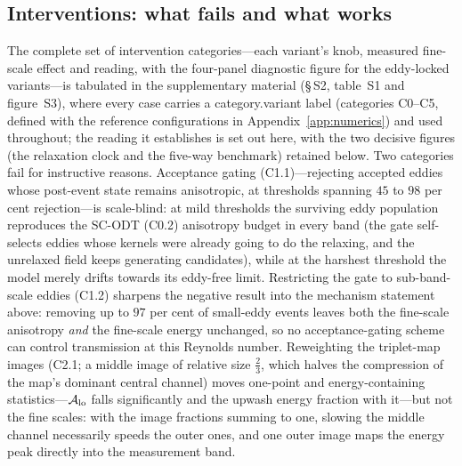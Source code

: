 \documentclass[lineno]{JFM-FLM_Au}
\begin{document}
\subsection{Interventions: what fails and what works}\label{sec:interventions}

The complete set of intervention categories---each variant's knob, measured fine-scale effect and reading, with the four-panel diagnostic figure for the eddy-locked variants---is tabulated in the supplementary material (\S\,S2, table~S1 and figure~S3), where every case carries a category.variant label (categories C0--C5, defined with the reference configurations in Appendix~\ref{app:numerics}) and used throughout; the reading it establishes is set out here, with the two decisive figures (the relaxation clock and the five-way benchmark) retained below. Two categories fail for instructive reasons. Acceptance gating (C1.1)---rejecting accepted eddies whose post-event state remains anisotropic, at thresholds
spanning $45$ to $98$ per cent rejection---is scale-blind: at mild
thresholds the surviving eddy population reproduces the SC-ODT (C0.2) anisotropy budget in every band (the gate self-selects eddies whose
kernels were already going to do the relaxing, and the unrelaxed field
keeps generating candidates), while at the harshest threshold the model
merely drifts towards its eddy-free limit. Restricting the gate to sub-band-scale eddies (C1.2) sharpens the negative result into the mechanism
statement above: removing up to $97$ per cent of small-eddy events leaves
both the fine-scale anisotropy \emph{and} the fine-scale energy
unchanged, so no acceptance-gating scheme can control transmission at
this Reynolds number. Reweighting the triplet-map images (C2.1; a middle image of relative size $\tfrac23$, which halves the compression of the
map's dominant central channel) moves one-point and energy-containing
statistics---$\mathcal A_{\rm lo}$ falls significantly and the upwash
energy fraction with it---but not the fine scales: with the image
fractions summing to one, slowing the middle channel necessarily speeds
the outer ones, and one outer image maps the energy peak directly into
the measurement band.
\end{document}
